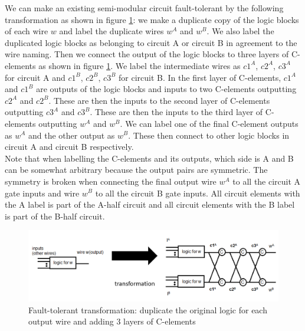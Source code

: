 \documentclass[12pt]{report}
\begin{document}
We can make an existing semi-modular circuit fault-tolerant by the following transformation as shown in figure \ref{fig:dupscheme}: we make a duplicate copy of the logic blocks of each wire $w$ and label the duplicate wires $w^A$ and $w^B$.  We also label the duplicated logic blocks as belonging to circuit A or circuit B in agreement to the wire naming.  Then we connect the output of the logic blocks to three layers of C-elements as shown in figure \ref{fig:dupscheme}.  We label the intermediate wires as $c1^A$, $c2^A$, $c3^A$ for circuit A and $c1^B$, $c2^B$, $c3^B$ for circuit B.  In the first layer of C-elements, $c1^A$ and $c1^B$ are outputs of the logic blocks and inputs to two C-elements outputting $c2^A$ and $c2^B$.  These are then the inputs to the second layer of C-elements outputting $c3^A$ and $c3^B$.  These are then the inputs to the third layer of C-elements outputting $w^A$ and $w^B$.  We can label one of the final C-element outputs as $w^A$ and the other output as $w^B$.  These then connect to other logic blocks in circuit A and circuit B respectively.  \\
Note that when labelling the C-elements and its outputs, which side is A and B can be somewhat arbitrary because the output pairs are symmetric.  The symmetry is broken when connecting the final output wire $w^A$ to all the circuit A gate inputs and wire $w^B$ to all the circuit B gate inputs.  All circuit elements with the A label is part of the A-half circuit and all circuit elements with the B label is part of the B-half circuit.\\%
\begin{figure}
  \centering
    \includegraphics[width=\textwidth]{circuitforproof3}
  \caption[Fault-tolerant transformation of each wire]{Fault-tolerant transformation: duplicate the original logic for each output wire and adding 3 layers of C-elements}
  \label{fig:dupscheme}
\end{figure}
\end{document}
